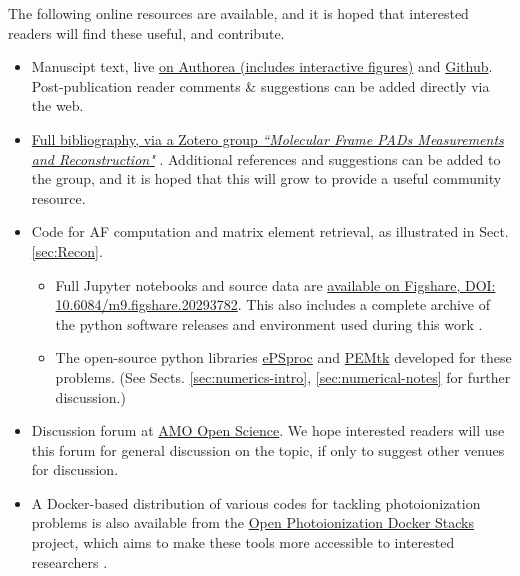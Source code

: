 \documentclass[10pt]{article}
\begin{document}
The following online resources are available, and it is hoped that interested readers will find these useful, and contribute.

\begin{itemize}
\item Manuscipt text, live \href{https://www.authorea.com/users/71114/articles/447808-extracting-molecular-frame-photoionization-dynamics-from-experimental-data}{on Authorea (includes interactive figures)} and \href{https://github.com/phockett/Extracting-Molecular-Frame-Photoionization-Dynamics-from-Experimental-Data}{Github}. Post-publication reader comments \& suggestions can be added directly via the web.
\item \href{https://www.zotero.org/groups/4733878/molecular_frame_pads_measurements_and_reconstruction}{Full bibliography, via a Zotero group \textit{``Molecular Frame PADs Measurements and Reconstruction"}} \cite{hockettZoteroGroupsMolecular}. Additional references and suggestions can be added to the group, and it is hoped that this will grow to provide a useful community resource.
\item Code for AF computation and matrix element retrieval, as illustrated in Sect. \ref{sec:Recon}. 
\begin{itemize}
\item Full Jupyter notebooks and source data are \href{http://dx.doi.org/10.6084/m9.figshare.20293782}{available on Figshare, DOI: 10.6084/m9.figshare.20293782}. This also includes a complete archive of the python software releases and environment used during this work \cite{hockett2022MFreconFigshare}.
\item The open-source python libraries \href{https://epsproc.readthedocs.io}{ePSproc} \cite{ePSprocAuthorea,ePSprocGithub,ePSprocDocs} and \href{https://pemtk.readthedocs.io}{PEMtk} \cite{hockett2021PEMtkDocs, hockett2021PEMtkGithub} developed for these problems. (See Sects. \ref{sec:numerics-intro}, \ref{sec:numerical-notes} for further discussion.)
\end{itemize}
\item Discussion forum at \href{https://amoopenscience.femtolab.ca/}{AMO Open Science}. We hope interested readers will use this forum for general discussion on the topic, if only to suggest other venues for discussion.
\item A Docker-based distribution of various codes for tackling photoionization problems is also available from the \href{https://github.com/phockett/open-photoionization-docker-stacks}{Open Photoionization Docker Stacks} project, which aims to make these tools more accessible to interested researchers \cite{hockettOpenPhotoionizationDocker}.
\end{itemize}
\end{document}
